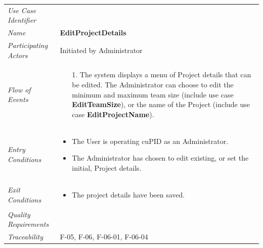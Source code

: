 \documentclass[12pt,letterpaper]{article}
\begin{document}
\begin{center}
	\begin{tabu} to 
		\toprule
		Use Case Identifier & \editprojectdetails{} \\
		Name & {\bf EditProjectDetails} \\
		Participating Actors & Initiated by Administrator \\
		Flow of Events & 
		\begin{minipage}[t]{\linewidth}
		    \begin{enumerate}
			    \item[1.] The system displays a menu of Project details that can be edited. The Administrator can choose to edit the minimum and maximum team size (include use case \textbf{EditTeamSize}), or the name of the Project (include use case \textbf{EditProjectName}).
			\end{enumerate}
		\end{minipage} \\

		Entry Conditions &
		\begin{minipage}[t]{\linewidth}
			\begin{itemize}
			    \item The User is operating cuPID as an Administrator.
			    \item The Administrator has chosen to edit existing, or set the initial, Project details.
	        \end{itemize}
		\end{minipage} \\

		Exit Conditions &
		\begin{minipage}[t]{\linewidth}
			\begin{itemize}
			    \item The project details have been saved.
	        \end{itemize}
		\end{minipage} \\


		Quality Requirements & \\

		Traceability & F-05, F-06, F-06-01, F-06-04 \\
		\toprule
	\end{tabu}
\end{center}
\end{document}
